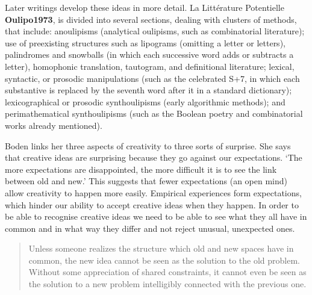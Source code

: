 %
\begin{leftbar}
Later writings develop these ideas in more detail. La Littérature Potentielle \textbf{Oulipo1973}, is divided into several sections, dealing with clusters of methods, that include: anoulipisms (analytical oulipisms, such as combinatorial literature); use of preexisting structures such as lipograms (omitting a letter or letters), palindromes and snowballs (in which each successive word adds or subtracts a letter), homophonic translation, tautogram, and definitional literature; lexical, syntactic, or prosodic manipulations (such as the celebrated S+7, in which each substantive is replaced by the seventh word after it in a standard dictionary); lexicographical or prosodic synthoulipisms (early algorithmic methods); and perimathematical synthoulipisms (such as the Boolean poetry and combinatorial works already mentioned).
\end{leftbar}

\begin{leftbar}
Boden links her three aspects of creativity to three sorts of surprise. She says that creative ideas are surprising because they go against our expectations. `The more expectations are disappointed, the more difficult it is to see the link between old and new.' \autocite[p.84]{Boden2003} This suggests that fewer expectations (an open mind) allow creativity to happen more easily. Empirical experiences form expectations, which hinder our ability to accept creative ideas when they happen. In order to be able to recognise creative ideas we need to be able to see what they all have in common and in what way they differ and not reject unusual, unexpected ones.
\end{leftbar}

\begin{quotation}
  Unless someone realizes the structure which old and new spaces have in common, the new idea cannot be seen as the solution to the old problem. Without some appreciation of shared constraints, it cannot even be seen as the solution to a new problem intelligibly connected with the previous one. 
\end{quotation}

